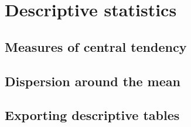 %
%
%
\section{Descriptive statistics}

	\subsection{Measures of central tendency}

	\subsection{Dispersion around the mean}

	\subsection{Exporting descriptive tables}

